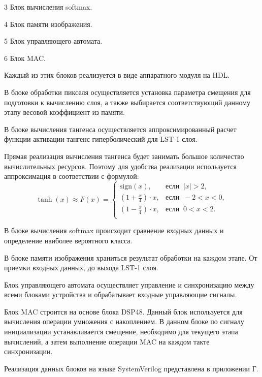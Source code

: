  3 Блок вычисления softmax.

  4 Блок памяти изображения.

  5 Блок управляющего автомата.

  6 Блок MAC.

Каждый из этих блоков реализуется в виде аппаратного модуля на HDL.\@

В блоке обработки пикселя осуществляется установка параметра смещения для 
подготовки к вычислению слоя, а также выбирается соответствующий данному этапу 
весовой коэффициент из памяти.

В блоке вычисления тангенса осуществляется аппроксимированный расчет функции 
активации тангенс гиперболический для LST-1 слоя.

Прямая реализация вычисления тангенса будет занимать большое количество 
вычислительных ресурсов. Поэтому для удобства реализации используется 
аппроксимация в соответствии с формулой\cite{TANH}:
\vspace{1mm}
\begin{equation}
    \tanh{(x)}\approx F(x) = 
      \begin{cases}
      \mathrm{sign}(x),         & \mathrm{\text{если}}\;\;  |x|>2, \\
      (1 + \frac{x}{4})\cdot x, & \mathrm{\text{если}}\;\; -2<x<0, \\
      (1 - \frac{x}{4})\cdot x, & \mathrm{\text{если}}\;\;  0<x<2. \\
      \end{cases}
\end{equation}
\vspace{1mm}

В блоке вычисления softmax происходит сравнение входных данных и определение 
наиболее вероятного класса.

В блоке памяти изображения храниться результат обработки на каждом этапе. От 
приемки входных данных, до выхода LST-1 слоя.

Блок управляющего автомата осуществляет управление и синхронизацию между всеми 
блоками устройства и обрабатывает входные управляющие сигналы.

Блок MAC строится на основе блока DSP48. Данный блок используется для 
вычисления операции умножения с накоплением. В данном блоке по сигналу 
инициализации устанавливается смещение, необходимо для текущего этапа 
вычислений, а затем выполнение операции MAC на каждом такте синхронизации.

Реализация данных блоков на языке SystemVerilog представлена в приложении Г.

